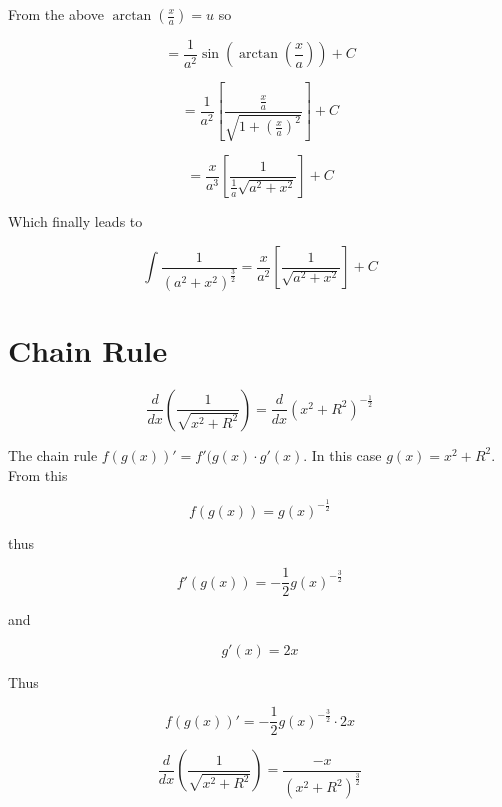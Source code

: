 \documentclass[14pt]{memoir}
\begin{document}
From the above $\arctan{(\frac{x}{a})} = u$ so

\begin{equation}
=  \frac{1}{a^2} \sin{(\arctan{(\frac{x}{a})})} + C
\end{equation}

\begin{equation}
=  \frac{1}{a^2} [\frac{\frac{x}{a}}{\sqrt{1+(\frac{x}{a})^2}}] + C
\end{equation}

\begin{equation}
=  \frac{x}{a^3} [\frac{1}{\frac{1}{a} \sqrt{a^2+x^2}}] + C
\end{equation}

Which finally leads to

\begin{equation}
\int \frac{1}{(a^2 + x^2)^{\frac{3}{2}}} =  \frac{x}{a^2} [\frac{1}{\sqrt{a^2+x^2}}] + C
\end{equation}

\chapter{Chain Rule}

\begin{equation}
\frac{d}{dx} (\frac{1}{\sqrt{x^2+R^2}}) = \frac{d}{dx} (x^2+R^2)^{-\frac{1}{2}} 
\end{equation}

The chain rule $ f(g(x))' = f'(g(x) \cdot g'(x)$. In this case $g(x) = x^2 + R^2$. From this

\begin{equation}
f(g(x)) = g(x)^{-\frac{1}{2}} 
\end{equation}

thus  

\begin{equation}
f'(g(x)) = -\frac{1}{2} g(x)^{-\frac{3}{2}} 
\end{equation}

and

\begin{equation}
g'(x) = 2x
\end{equation}

Thus

\begin{equation}
f(g(x))' =  -\frac{1}{2} g(x)^{-\frac{3}{2}}  \cdot 2x
\end{equation}

\begin{equation}
\frac{d}{dx} (\frac{1}{\sqrt{x^2+R^2}}) = \frac{-x}{(x^2 + R^2)^\frac{3}{2}}
\end{equation}
\end{document}
